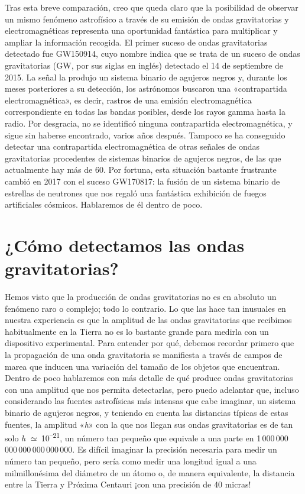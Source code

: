 Tras esta breve comparación, creo que queda claro que la posibilidad de observar un mismo fenómeno astrofísico a través de su emisión de ondas gravitatorias y electromagnéticas representa una oportunidad fantástica para multiplicar y ampliar la información recogida. El primer suceso de ondas gravitatorias detectado fue GW150914, cuyo nombre indica que se trata de un suceso de ondas gravitatorias (GW, por sus siglas en inglés) detectado el 14 de septiembre de 2015. La señal la produjo un sistema binario de agujeros negros y, durante los meses posteriores a su detección, los astrónomos buscaron una «contrapartida electromagnética», es decir, rastros de una emisión electromagnética correspondiente en todas las bandas posibles, desde los rayos gamma hasta la radio. Por desgracia, no se identificó ninguna contrapartida electromagnética, y sigue sin haberse encontrado, varios años después. Tampoco se ha conseguido detectar una contrapartida electromagnética de otras señales de ondas gravitatorias procedentes de sistemas binarios de agujeros negros, de las que actualmente hay más de 60. Por fortuna, esta situación bastante frustrante cambió en 2017 con el suceso GW170817: la fusión de un sistema binario de estrellas de neutrones que nos regaló una fantástica exhibición de fuegos artificiales cósmicos. Hablaremos de él dentro de poco.

\section{¿Cómo detectamos las ondas gravitatorias?}\label{sec:08-detectors}

Hemos visto que la producción de ondas gravitatorias no es en absoluto un fenómeno raro o complejo; todo lo contrario. Lo que las hace tan inusuales en nuestra experiencia es que la amplitud de las ondas gravitatorias que recibimos habitualmente en la Tierra no es lo bastante grande para medirla con un dispositivo experimental. Para entender por qué, debemos recordar primero que la propagación de una onda gravitatoria se manifiesta a través de campos de marea que inducen una variación del tamaño de los objetos que encuentran. Dentro de poco hablaremos con más detalle de qué produce ondas gravitatorias con una amplitud que nos permita detectarlas, pero puedo adelantar que, incluso considerando las fuentes astrofísicas más intensas que cabe imaginar, un sistema binario de agujeros negros, y teniendo en cuenta las distancias típicas de estas fuentes, la amplitud «\emph{h}» con la que nos llegan sus ondas gravitatorias es de tan solo \emph{h} \(\simeq \ \)10\textsuperscript{--21}, un número tan pequeño que equivale a una parte en 1\,000\,000\,000\,000\,000\,000\,000. Es difícil imaginar la precisión necesaria para medir un número tan pequeño, pero sería como medir una longitud igual a una milmillonésima del diámetro de un átomo o, de manera equivalente, la distancia entre la Tierra y Próxima Centauri ¡con una precisión de 40 micras!

